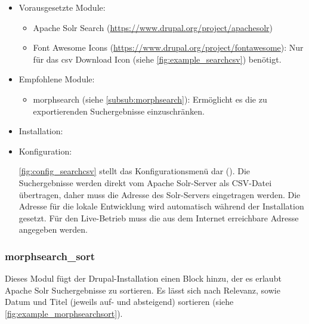 \begin{itemize}[parsep=0pt, itemsep=5.0pt plus 2.0pt minus 1.0pt, leftmargin=*]
	\item Vorausgesetzte Module:
	
	\begin{itemize}
		\item 	Apache Solr Search (\url{https://www.drupal.org/project/apachesolr})
		
		\item Font Awesome Icons (\url{https://www.drupal.org/project/fontawesome}): Nur für das csv Download Icon (siehe \cref{fig:example_searchcsv}) benötigt.
	\end{itemize}
	
	
	\item Empfohlene Module:
	
	\begin{itemize}
		\item morphsearch (siehe \cref{subsub:morphsearch}): Ermöglicht es die zu exportierenden Suchergebnisse einzuschränken.
	\end{itemize}
	
	
	\item Installation: \standardinstall
	
	\item Konfiguration:
	
	\cref{fig:config_searchcsv} stellt das Konfigurationsmenü dar (). Die Suchergebnisse werden direkt vom Apache Solr-Server als CSV-Datei übertragen, daher muss die Adresse des Solr-Servers eingetragen werden. Die Adresse für die lokale Entwicklung wird automatisch während der Installation gesetzt. Für den Live-Betrieb muss die aus dem Internet erreichbare Adresse angegeben werden.

\end{itemize}






\newpage
\subsubsection{morphsearch\_sort}\label{subsub:morphsearchsort}
Dieses Modul fügt der Drupal-Installation einen Block hinzu, der es erlaubt Apache Solr Suchergebnisse zu sortieren. Es lässt sich nach Relevanz, sowie Datum und Titel (jeweils auf- und absteigend) sortieren (siehe \cref{fig:example_morphsearchsort}).


